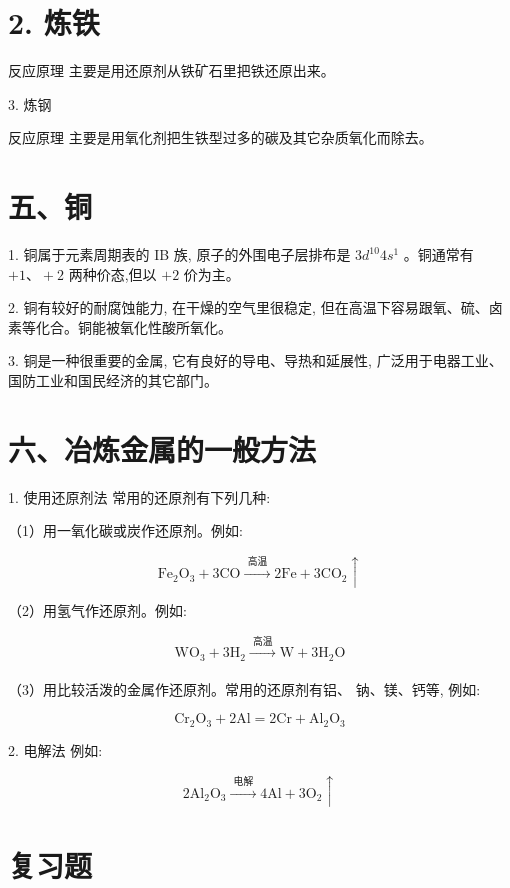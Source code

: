 \documentclass[10pt]{article}
\begin{document}
\section*{2. 炼铁}

反应原理 主要是用还原剂从铁矿石里把铁还原出来。

3. 炼钢

反应原理 主要是用氧化剂把生铁型过多的碳及其它杂质氧化而除去。

\section*{五、铜}

1. 铜属于元素周期表的 IB 族, 原子的外围电子层排布是 \(3{d}^{10}4{s}^{1}\) 。铜通常有 \(+ 1\text{、} + 2\) 两种价态,但以 \(+ 2\) 价为主。

2. 铜有较好的耐腐蚀能力, 在干燥的空气里很稳定, 但在高温下容易跟氧、硫、卤素等化合。铜能被氧化性酸所氧化。

3. 铜是一种很重要的金属, 它有良好的导电、导热和延展性, 广泛用于电器工业、国防工业和国民经济的其它部门。

\section*{六、冶炼金属的一般方法}

1. 使用还原剂法 常用的还原剂有下列几种:

（1）用一氧化碳或炭作还原剂。例如:

\[
{\mathrm{{Fe}}}_{2}{\mathrm{O}}_{3} + 3\mathrm{{CO}}\xrightarrow[]{\text{ 高温 }}2\mathrm{{Fe}} + 3{\mathrm{{CO}}}_{2} \uparrow
\]

（2）用氢气作还原剂。例如:

\[
{\mathrm{{WO}}}_{3} + 3{\mathrm{H}}_{2}\xrightarrow[]{\text{ 高温 }}\mathrm{W} + 3{\mathrm{H}}_{2}\mathrm{O}
\]

（3）用比较活泼的金属作还原剂。常用的还原剂有铝、 钠、镁、钙等, 例如:

\[
{\mathrm{{Cr}}}_{2}{\mathrm{O}}_{3} + 2\mathrm{{Al}} = 2\mathrm{{Cr}} + {\mathrm{{Al}}}_{2}{\mathrm{O}}_{3}
\]

2. 电解法 例如:

\[
2{\mathrm{{Al}}}_{2}{\mathrm{O}}_{3}\xrightarrow[]{\text{ 电解 }}4\mathrm{{Al}} + 3{\mathrm{O}}_{2} \uparrow
\]

\section*{复习题}
\end{document}

